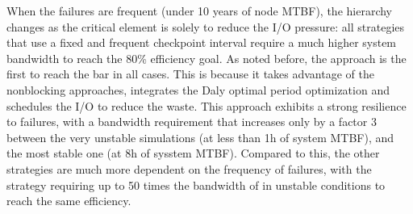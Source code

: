 When the failures are frequent (under 10 years of node MTBF), the
hierarchy changes as the critical element is solely to reduce the I/O
pressure: all strategies that use a fixed and frequent checkpoint
interval require a much higher system bandwidth to reach the 80\%
efficiency goal.  As noted before, the \cooperative approach is the
first to reach the bar in all cases. This is because it takes
advantage of the nonblocking approaches, integrates the Daly optimal
period optimization and schedules the I/O to reduce the waste.
This approach exhibits a strong resilience to failures, with a
bandwidth requirement that increases only by a factor 3 between the
very unstable simulations (at less than 1h of system MTBF), and the
most stable one (at 8h of sysstem MTBF). Compared to this, the other
strategies are much more dependent on the frequency of failures, with
the \propfixed strategy requiring up to 50 times the bandwidth of
\cooperative in unstable conditions to reach the same efficiency.
